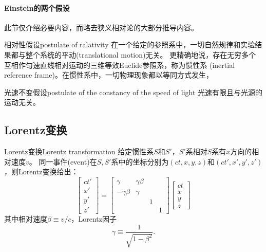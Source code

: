 \paragraph{Einstein的两个假设}

此节仅介绍必要内容，而略去狭义相对论的大部分推导内容。%

\begin{theorem}
    {相对性假设}{postulate of ralativity}
    在一个给定的参照系中，一切自然规律和实验结果都与整个系统的平动(translational motion)无关。
    更精确地说，存在无穷多个互相作匀速直线相对运动的三维等效Euclide参照系，称为惯性系
    (inertial reference frame)。在惯性系中，一切物理现象都以等同方式发生，
\end{theorem}

\begin{theorem}
    {光速不变假设}{postulate of the constancy of the speed of light}
    光速有限且与光源的运动无关。
\end{theorem}

\subsection{Lorentz变换}

\begin{theorem}
    {Lorentz变换}{Lorentz transformation}
    给定惯性系$S$和$S'$，$S'$系相对$S$系有$x$方向的相对速度$v$。
    同一事件(event)在$S,S'$系中的坐标分别为$(ct,x,y,z)$和$(ct',x',y',z')$，则Lorentz变换给出：
    \begin{equation}
    	\begin{bmatrix}
    		ct'\\x'\\y'\\z'
    	\end{bmatrix}=
    	\begin{bmatrix}
    		\gamma&\gamma\beta\\-\gamma\beta&\gamma\\ &&1\\ &&&1
    	\end{bmatrix}
    	\begin{bmatrix}
    		ct\\x\\y\\z
    	\end{bmatrix}
    \end{equation}
    其中相对速度$\beta\equiv v/c$，Lorentz因子
    \[
        \gamma\equiv\frac1{\sqrt{1-\beta^2}}.
    \]
\end{theorem}

